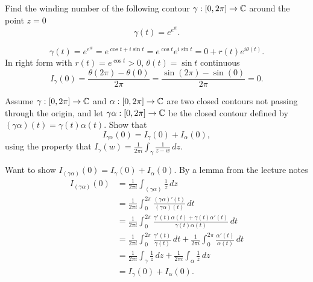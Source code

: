 \documentclass[10pt, a4paper]{article}
\begin{document}
\begin{problem}
    Find the winding number of the following contour $\gamma : [0, 2\pi] \to \mathbb{C}$ around the point $z = 0$
    \[
    \gamma(t) = e ^ {e ^ {it}}.
    \]

    \begin{solution}
        \[
        \gamma(t) = e ^ {e ^ {it}} = e ^ {\cos{t} + i\sin{t}} = e ^ {\cos{t}}e ^ {i\sin{t}} = 0 + r(t)e ^ {i\theta(t)}.
        \]
        In right form with $r(t) = e ^ {\cos{t}} > 0$,
        $\theta(t) = \sin{t}$ continuous
        \[
        I_{\gamma}(0) = \frac{\theta(2\pi) - \theta(0)}{2\pi} = \frac{\sin(2\pi) - \sin(0)}{2\pi} = 0.
        \]
    \end{solution}
\end{problem}

\begin{problem}
    Assume $\gamma : [0, 2\pi] \to \mathbb{C}$ and $\alpha : [0, 2\pi] \to \mathbb{C}$ are two closed contours not passing through the origin,
    and let $\gamma\alpha : [0, 2\pi] \to \mathbb{C}$ be the closed contour defined by $(\gamma\alpha)(t) = \gamma(t)\alpha(t)$.
    Show that
    \[
    I_{\gamma\alpha}(0) = I_{\gamma}(0) + I_{\alpha}(0),
    \]
    using the property that $I_{\gamma}(w) = \frac{1}{2\pi i}\int_{\gamma}\frac{1}{z - w}\,dz$.

    \begin{solution}
        Want to show $I_{(\gamma\alpha)}(0) = I_{\gamma}(0) + I_{\alpha}(0)$.
        By a lemma from the lecture notes
        \begin{align*}
            I_{(\gamma\alpha)}(0) &= \frac{1}{2\pi i}\int_{(\gamma\alpha)}\frac{1}{z}\,dz \\
            &= \frac{1}{2\pi i}\int_{0}^{2\pi}\frac{(\gamma\alpha)'(t)}{(\gamma\alpha)(t)}\,dt \\
            &= \frac{1}{2\pi i}\int_{0}^{2\pi}\frac{\gamma'(t)\alpha(t) + \gamma(t)\alpha'(t)}{\gamma(t)\alpha(t)}\,dt \\
            &= \frac{1}{2\pi i}\int_{0}^{2\pi}\frac{\gamma'(t)}{\gamma(t)}\,dt + \frac{1}{2\pi i}\int_{0}^{2\pi}\frac{\alpha'(t)}{\alpha(t)}\,dt \\
            &= \frac{1}{2\pi i}\int_{\gamma}\frac{1}{z}\,dz + \frac{1}{2\pi i}\int_{\alpha}\frac{1}{z}\,dz \\
            &= I_{\gamma}(0) + I_{\alpha}(0).
        \end{align*}
    \end{solution}
\end{problem}
\end{document}
